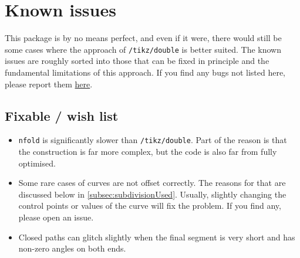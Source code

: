 \documentclass[12pt,a4paper]{article}
\theoremstyle{definition}
\newcommand{\tikzdouble}{\texttt{/tikz/double}}
\newcommand{\nfold}{\texttt{nfold}}
\begin{document}
\section{Known issues}

This package is by no means perfect, and even if it were, there would still be some cases where the approach of \tikzdouble{} is better suited. The known issues are roughly sorted into those that can be fixed in principle and the fundamental limitations of this approach. If you find any bugs not listed here, please report them \href{https://github.com/jonschz/tikz-nfold/issues/}{here}.

\subsection{Fixable / wish list}
\begin{itemize}
  \item \nfold{} is significantly slower than \tikzdouble. Part of the reason is that the construction is far more complex, but the code is also far from fully optimised.
  \item Some rare cases of curves are not offset correctly. The reasons for that are discussed below in \cref{subsec:subdivisionUsed}. Usually, slightly changing the control points or values of the curve will fix the problem. If you find any, please open an issue.
  \item Closed paths can glitch slightly when the final segment is very short and has non-zero angles on both ends.
\end{itemize}
\end{document}
